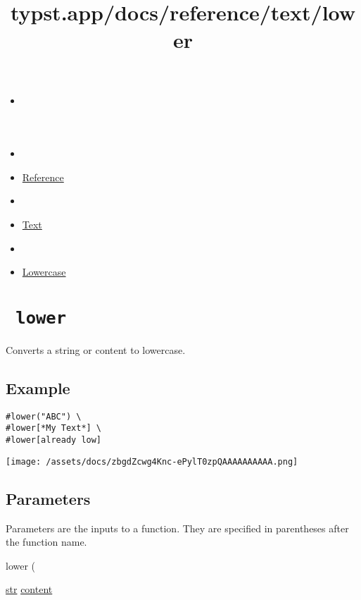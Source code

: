 \title{typst.app/docs/reference/text/lower}

\begin{itemize}
\tightlist
\item
  \href{/docs}{}
\item
  
\item
  \href{/docs/reference/}{Reference}
\item
  
\item
  \href{/docs/reference/text/}{Text}
\item
  
\item
  \href{/docs/reference/text/lower/}{Lowercase}
\end{itemize}

\section{\texorpdfstring{\texttt{\ lower\ }}{ lower }}\label{summary}

Converts a string or content to lowercase.

\subsection{Example}\label{example}

\begin{verbatim}
#lower("ABC") \
#lower[*My Text*] \
#lower[already low]
\end{verbatim}

\texttt{[image: /assets/docs/zbgdZcwg4Knc-ePylT0zpQAAAAAAAAAA.png]}

\subsection{\texorpdfstring{{ Parameters
}}{ Parameters }}\label{parameters}

\label{parameters-tooltip}
Parameters are the inputs to a function. They are specified in
parentheses after the function name.

{ lower } (

{ \href{/docs/reference/foundations/str/}{str}
\href{/docs/reference/foundations/content/}{content} }

